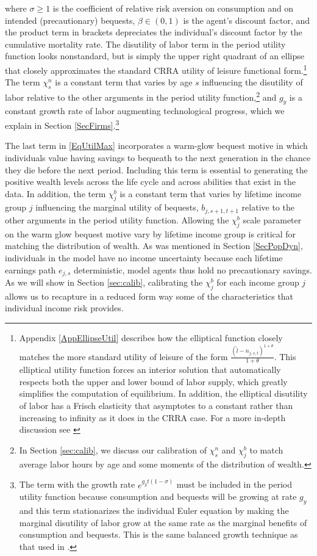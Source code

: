 \documentclass[letterpaper,12pt]{article}
\theoremstyle{definition}
\begin{document}
\begin{spacing}{1.5}
    where $\sigma\geq 1$ is the coefficient of relative risk aversion on consumption and on intended (precautionary) bequests, $\beta\in(0,1)$ is the agent's discount factor, and the product term in brackets depreciates the individual's discount factor by the cumulative mortality rate. The disutility of labor term in the period utility function looks nonstandard, but is simply the upper right quadrant of an ellipse that closely approximates the standard CRRA utility of leisure functional form.\footnote{Appendix \ref{AppEllipseUtil} describes how the elliptical function closely matches the more standard utility of leisure of the form $\frac{(\tilde{l}-n_{j,s,t})^{1+\theta}}{1+\theta}$. This elliptical utility function forces an interior solution that automatically respects both the upper and lower bound of labor supply, which greatly simplifies the computation of equilibrium. In addition, the elliptical disutility of labor has a Frisch elasticity that asymptotes to a constant rather than increasing to infinity as it does in the CRRA case. For a more in-depth discussion see \citet{EvanPhillips:2015}} The term $\chi^n_s$ is a constant term that varies by age $s$ influencing the disutility of labor relative to the other arguments in the period utility function,\footnote{In Section \ref{sec:calib}, we discuss our calibration of $\chi^n_s$ and $\chi^b_j$ to match average labor hours by age and some moments of the distribution of wealth.} and $g_y$ is a constant growth rate of labor augmenting technological progress, which we explain in Section \ref{SecFirms}.\footnote{The term with the growth rate $e^{g_y t(1-\sigma)}$ must be included in the period utility function because consumption and bequests will be growing at rate $g_y$ and this term stationarizes the individual Euler equation by making the marginal disutility of labor grow at the same rate as the marginal benefits of consumption and bequests.  This is the same balanced growth technique as that used in \citet{MertensRavn:2011}.}

    The last term in \eqref{EqUtilMax} incorporates a warm-glow bequest motive in which individuals value having savings to bequeath to the next generation in the chance they die before the next period. Including this term is essential to generating the positive wealth levels across the life cycle and across abilities that exist in the data. In addition, the term $\chi^b_j$ is a constant term that varies by lifetime income group $j$ influencing the marginal utility of bequests, $b_{j,s+1,t+1}$ relative to the other arguments in the period utility function. Allowing the $\chi^b_j$ scale parameter on the warm glow bequest motive vary by lifetime income group is critical for matching the distribution of wealth. As was mentioned in Section \ref{SecPopDyn}, individuals in the model have no income uncertainty because each lifetime earnings path $e_{j,s}$ deterministic, model agents thus hold no precautionary savings. As we will show in Section \ref{sec:calib}, calibrating the $\chi^b_j$ for each income group $j$ allows us to recapture in a reduced form way some of the characteristics that individual income risk provides.


\end{spacing}
\end{document}
